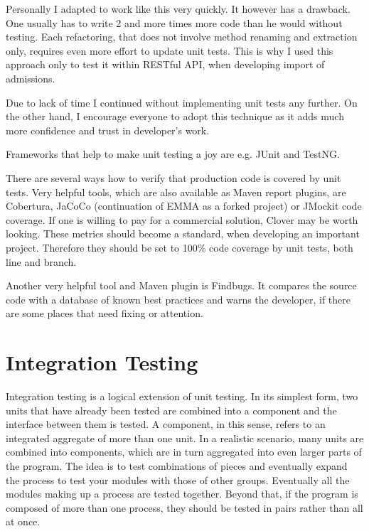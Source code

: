 	Personally I adapted to work like this very quickly. It however has a drawback. One usually has to write 2 and more
	times more code than he would without testing. Each refactoring, that does not involve method renaming and extraction
	only, requires even more effort to update unit tests. This is why I used this approach only to test it within RESTful
	API, when developing import of admissions.
	
	Due to lack of time I continued without implementing unit tests any further. On the other hand, I encourage everyone to
	adopt this technique as it adds much more confidence and trust in developer's work.

	Frameworks that help to make unit testing a joy are e.g. JUnit and TestNG.
	
	There are several ways how to verify that production code is covered by unit tests. Very helpful tools, which are
	also available as Maven report plugins, are Cobertura, JaCoCo (continuation of EMMA as a forked project) or JMockit
	code coverage.
	If one is willing to pay for a commercial solution, Clover may be worth looking. These metrics should become a standard, when developing an important
	project. Therefore they should be set to 100\% code coverage by unit tests, both line and branch.
	
	Another very helpful tool and Maven plugin is Findbugs. It compares the source code with a database of known best
	practices and warns the developer, if there are some places that need fixing or attention.

	\section{Integration Testing}
	
	\cite{msdnintegration}
	Integration testing is a logical extension of unit testing. In its simplest form, two units that have already been
	tested are combined into a component and the interface between them is tested. A component, in this sense, refers to an
	integrated aggregate of more than one unit. In a realistic scenario, many units are combined into components, which are
	in turn aggregated into even larger parts of the program. The idea is to test combinations of pieces and eventually
	expand the process to test your modules with those of other groups. Eventually all the modules making up a process are
	tested together. Beyond that, if the program is composed of more than one process, they should be tested in pairs
	rather than all at once.

